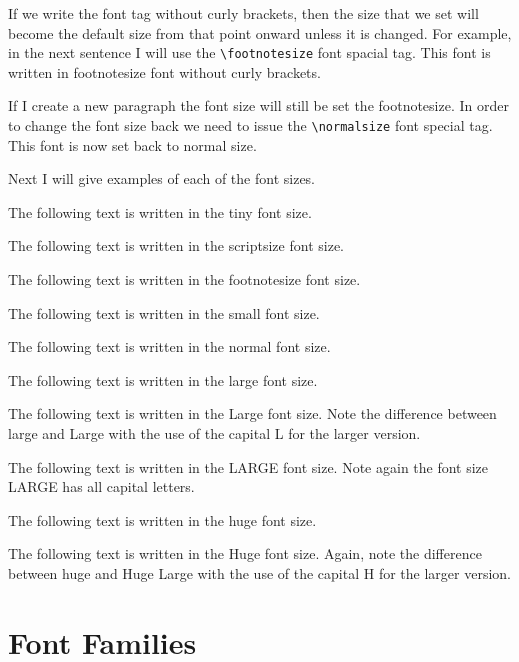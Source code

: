 If we write the font tag without curly brackets, then the size that we set will become the default size from that point onward unless it is changed. For example, in the next sentence I will use the \verb|\footnotesize| font spacial tag. \footnotesize This font is written in footnotesize font without curly brackets. 

\vspace{0.4cm}

If I create a new paragraph the font size will still be set the footnotesize. In order to change the font size back we need to issue the \verb|\normalsize| font special tag. \normalsize This font is now set back to normal size.     

\vspace{0.4cm}

Next I will give examples of each of the font sizes. 

\vspace{0.4cm}


The following text is written in the {\tiny tiny font size.} 

The following text is written in the {\scriptsize scriptsize font size.} 

The following text is written in the {\footnotesize footnotesize font size.} 

The following text is written in the {\small small font size.} 

The following text is written in the {\normalsize normal font size.} 

The following text is written in the {\large large font size.} 

The following text is written in the {\Large Large font size.} Note the difference between large and Large with the use of the capital L for the larger version. 

The following text is written in the {\LARGE LARGE font size.} Note again the font size LARGE has all capital letters.

The following text is written in the {\huge huge font size.} 

The following text is written in the {\Huge Huge font size.} Again, note the difference between huge and Huge Large with the use of the capital H for the larger version. 

\newpage

\section{Font Families}


